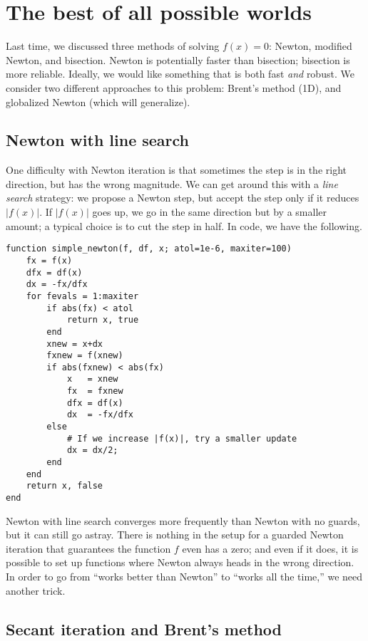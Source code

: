 \documentclass[12pt, leqno]{article}
\begin{document}


\section{The best of all possible worlds}

Last time, we discussed three methods of solving $f(x) = 0$:
Newton, modified Newton, and bisection.  Newton is potentially faster
than bisection; bisection is more reliable.  Ideally, we would like
something that is both fast {\em and} robust.  We consider two
different approaches to this problem: Brent's method (1D), and
globalized Newton (which will generalize).

\subsection{Newton with line search}

One difficulty with Newton iteration is that sometimes the step is
in the right direction, but has the wrong magnitude.  We can get
around this with a {\em line search} strategy: we propose a Newton
step, but accept the step only if it reduces $|f(x)|$.  If $|f(x)|$
goes up, we go in the same direction but by a smaller amount;
a typical choice is to cut the step in half.  In code, we have the following.

\begin{lstlisting}
function simple_newton(f, df, x; atol=1e-6, maxiter=100)
    fx = f(x)
    dfx = df(x)
    dx = -fx/dfx
    for fevals = 1:maxiter
        if abs(fx) < atol
            return x, true
        end
        xnew = x+dx
        fxnew = f(xnew)
        if abs(fxnew) < abs(fx)
            x   = xnew
            fx  = fxnew
            dfx = df(x)
            dx  = -fx/dfx
        else
            # If we increase |f(x)|, try a smaller update
            dx = dx/2;
        end
    end
    return x, false
end
\end{lstlisting}

Newton with line search converges more frequently than Newton with no
guards, but it can still go astray.  There is nothing in the setup for
a guarded Newton iteration that guarantees the function $f$ even has a
zero; and even if it does, it is possible to set up functions where
Newton always heads in the wrong direction.  In order to go from
``works better than Newton'' to ``works all the time,'' we need
another trick.

\subsection{Secant iteration and Brent's method}
\end{document}
